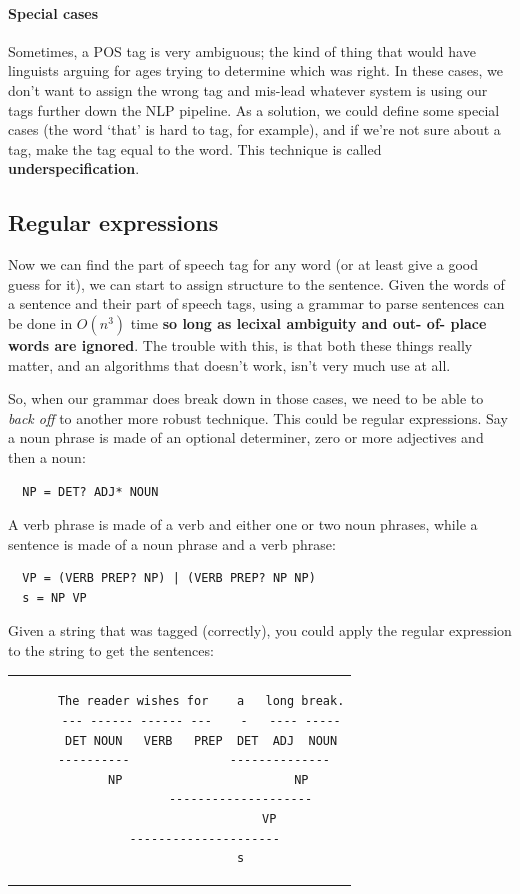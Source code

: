 \paragraph{Special cases} Sometimes, a POS tag is very ambiguous; the kind of
thing that would have linguists arguing for ages trying to determine which was
right. In these cases, we don't want to assign the wrong tag and mis-lead
whatever system is using our tags further down the NLP pipeline. As a solution,
we could define some special cases (the word `that' is hard to tag, for
example), and if we're not sure about a tag, make the tag equal to the word.
This technique is called \textbf{underspecification}.

\subsection{Regular expressions}

Now we can find the part of speech tag for any word (or at least give a good
guess for it), we can start to assign structure to the sentence. Given the words
of a sentence and their part of speech tags, using a grammar to parse sentences
can be done in $O(n^3)$ time \textbf{so long as lecixal ambiguity and out- of-
place words are ignored}. The trouble with this, is that both these things
really matter, and an algorithms that doesn't work, isn't very much use at all.

So, when our grammar does break down in those cases, we need to be able to
\textit{back off} to another more robust technique. This could be regular
expressions. Say a noun phrase is made of an optional determiner, zero or more
adjectives and then a noun:

\begin{verbatim}
  NP = DET? ADJ* NOUN
\end{verbatim}

A verb phrase is made of a verb and either one or two noun phrases, while a
sentence is made of a noun phrase and a verb phrase:

\begin{verbatim}
  VP = (VERB PREP? NP) | (VERB PREP? NP NP)
  s = NP VP
\end{verbatim}

Given a string that was tagged (correctly), you could apply the regular
expression to the string to get the sentences:

\begin{center}
  \begin{tabular}{c}
    \begin{lstlisting}
      The reader wishes for    a   long break.
      --- ------ ------ ---    -   ---- -----
      DET NOUN   VERB   PREP  DET  ADJ  NOUN
      ----------              --------------  
        NP                        NP
                 --------------------
                         VP
       ---------------------
                 s
    \end{lstlisting}
  \end{tabular}
\end{center}

